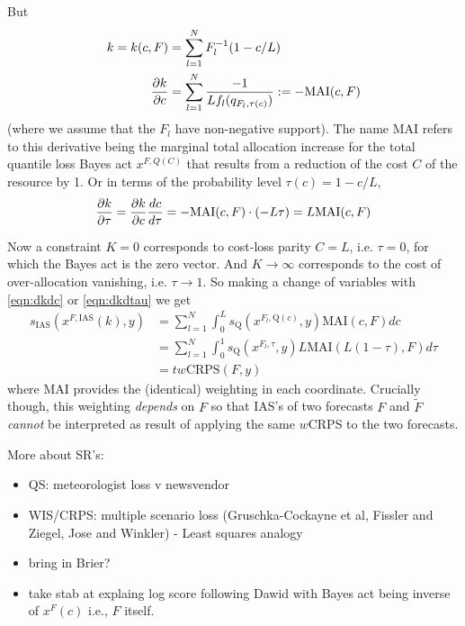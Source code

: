 \documentclass{article}
\begin{document}
But 
\begin{align}
k = k(c,F) &= \sum_{l=1}^{N} F_l^{-1}(1-c/L) \\
\frac{\partial {k} }{\partial {c}}& = \sum_{l=1}^{N} \frac{-1}{L f_l(q_{F_l,\tau(c)})} := -\mathrm{MAI}(c,F)\label{eqn:dkdc}
\end{align}
(where we assume that the $F_l$ have non-negative support). The name MAI refers to this derivative being the marginal total allocation increase for the total quantile loss Bayes act $x^{F,Q(C)}$ that results from a reduction of the cost $C$ of the resource by 1. Or in terms of the probability level $\tau(c)=1-c/L$,
\begin{align}
\frac{\partial {k} }{\partial {\tau}} = \frac{\partial {k} }{\partial {c}}\frac{d {c} }{d {\tau}} = -\mathrm{MAI}(c,F) \cdot (-L\tau) = L\mathrm{MAI}(c,F) \label{eqn:dkdtau}
\end{align}

Now a constraint $K = 0$ corresponds to cost-loss parity $C=L$, i.e. $\tau = 0$, for which the Bayes act is the zero vector.  And $K \to \infty$ corresponds to the cost of over-allocation vanishing, i.e. $\tau \to 1$. So making a change of variables with \eqref{eqn:dkdc} or \eqref{eqn:dkdtau} we get
\begin{align}
s_{\mathrm{IAS}}(x^{F, \mathrm{IAS}}(k), y) 
&= \sum_{l=1}^N \int_0^{L} s_{\mathrm{Q}}(x^{F_l, \mathrm{Q}(c)}, y) \mathrm{MAI}(c,F) dc \\
&= \sum_{l=1}^N \int_0^{1} s_{\mathrm{Q}}(x^{F_l, \tau}, y) L\mathrm{MAI}(L(1-\tau),F) d\tau \\
&= tw\mathrm{CRPS}(F,y)
\end{align}
where MAI provides the (identical) weighting in each coordinate. Crucially though, this weighting \emph{depends} on $F$ so that IAS's of two forecasts $F$ and $\tilde{F}$ \emph{cannot} be interpreted as result of applying the same $w$CRPS to the two forecasts.

More about SR's:
\begin{itemize}
\item QS: meteorologist loss v newsvendor
\item WIS/CRPS: multiple scenario loss (Gruschka-Cockayne et al, Fissler and Ziegel, Jose and Winkler)
	- Least squares analogy
\item bring in Brier?
\item take stab at explaing log score following Dawid with Bayes act being inverse of $x^F(c)$ i.e., $F$ itself.
\end{itemize}
\end{document}
